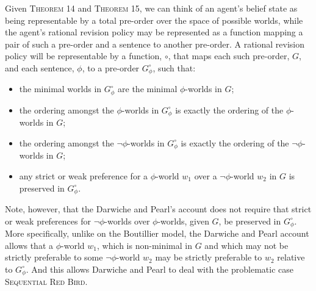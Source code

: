 Given \textsc{Theorem 14} and \textsc{Theorem 15}, we can think of an agent's belief state as being representable by a total pre-order over the space of possible worlds, while the agent's rational revision policy may be represented as a function mapping a pair of such a pre-order and a sentence to another pre-order.
A rational revision policy will be representable by a function, $\circ$, that maps each such pre-order, $G$, and each sentence, $\phi$, to a pre-order $G^\circ_\phi$, such that:
\begin{itemize}
\item the minimal worlds in $G^\circ_\phi$ are the minimal $\phi$-worlds in $G$;
\item the ordering amongst the $\phi$-worlds in $G^\circ_\phi$ is exactly the ordering of the $\phi$-worlds in $G$;
\item the ordering amongst the $\lnot \phi$-worlds in $G^\circ_\phi$ is exactly the ordering of the $\lnot \phi$-worlds in $G$;
\item any strict or weak preference for a $\phi$-world $w_1$ over a $\lnot \phi$-world $w_2$ in $G$ is preserved in $G^\circ_\phi$.
\end{itemize}

Note, however, that the Darwiche and Pearl's account does not require that strict or weak preferences for $\lnot \phi$-worlds over $\phi$-worlds, given $G$, be preserved in $G^\circ_\phi$.
More specifically, unlike on the Boutillier model, the Darwiche and Pearl account allows that a $\phi$-world $w_1$, which is non-minimal in $G$ and which may not be strictly preferable to some $\lnot \phi$-world $w_2$ may be strictly preferable to $w_2$ relative to $G^\circ_\phi$.
And this allows Darwiche and Pearl to deal with the problematic case \textsc{Sequential Red Bird}.

